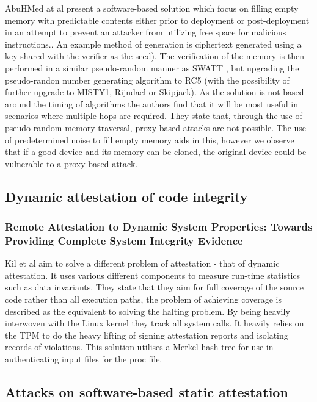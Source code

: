 AbuHMed at al \cite{AbuHmed2009} present a software-based solution which focus on filling empty memory with predictable contents either prior to deployment or post-deployment in an attempt to prevent an attacker from utilizing free space for malicious instructions.. An example method of generation is ciphertext generated using a key shared with the verifier as the seed). The verification of the memory is then performed in a similar pseudo-random manner as SWATT \cite{Seshadri2004}, but upgrading the pseudo-randon number generating algorithm to RC5 (with the possibility of further upgrade to MISTY1, Rijndael or Skipjack). As the solution is not based around the timing of algorithms the authors find that it will be most useful in scenarios where multiple hops are required. They state that, through the use of pseudo-random memory traversal, proxy-based attacks are not possible. The use of predetermined noise to fill empty memory aids in this, however we observe that if a good device and its memory can be cloned, the original device could be vulnerable to a proxy-based attack.

\subsection{Dynamic attestation of code integrity} \label{dynamicAttestationSolutions}

\subsubsection{Remote Attestation to Dynamic System Properties: Towards Providing Complete System Integrity Evidence}

Kil et al \cite{Kil2009} aim to solve a different problem of attestation - that of dynamic attestation. It uses various different components to measure run-time statistics such as data invariants. They state that they aim for full coverage of the source code rather than all execution paths, the problem of achieving coverage is described as the equivalent to solving the halting problem. By being heavily interwoven with the Linux kernel they track all system calls. It heavily relies on the TPM to do the heavy lifting of signing attestation reports and isolating records of violations. This solution utilises a Merkel hash tree for use in authenticating input files for the proc file.

\subsection{Attacks on software-based static attestation} \label{attestationSolutionsAttacks}

